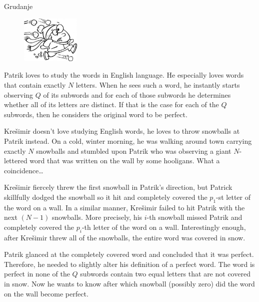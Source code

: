 \begin{statement}[
  problempoints=70,
  timelimit=1 second,
  memorylimit=512 MiB,
]{Grudanje}

\setlength\intextsep{-0.1cm}
\begin{figure}
\centering
\includegraphics[width=0.25\textwidth]{img/gruda.png}
\end{figure}


Patrik loves to study the words in English language. He especially loves words
that contain exactly $N$ letters. When he sees such a word, he instantly starts
observing $Q$ of its subwords and for each of those subwords he determines
whether all of its letters are distinct. If that is the case for each of the
$Q$ subwords, then he considers the original word to be perfect.

  Krešimir doesn't love studying English words, he loves to throw snowballs at
Patrik instead. On a cold, winter morning, he was walking around town
carrying exactly $N$ snowballs and stumbled upon Patrik who was observing a
giant $N$-lettered word that was written on the wall by some hooligans.  What
a coincidence\dots

Krešimir fiercely threw the first snowball in Patrik's direction, but Patrick
skillfully dodged the snowball so it hit and completely
covered the $p_1$-st letter of the word on a wall. In a similar manner,
Krešimir failed to hit Patrik with the next $(N-1)$ snowballs. More precisely,
his $i$-th snowball missed Patrik and completely covered the $p_i$-th letter
of the word on a wall. Interestingly enough, after Krešimir threw all of the
snowballs, the entire word was covered in snow.

Patrik glanced at the completely covered word and concluded that it was perfect.
Therefore, he needed to slightly alter his definition of a perfect word. The
word is perfect in none of the $Q$ subwords contain two equal letters that are
not covered in snow. Now he wants to know after which snowball (possibly
zero) did the word on the wall become perfect.


\end{statement}
